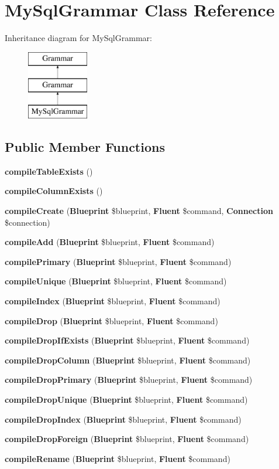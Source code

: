 \section{My\+Sql\+Grammar Class Reference}
\label{class_illuminate_1_1_database_1_1_schema_1_1_grammars_1_1_my_sql_grammar}
Inheritance diagram for My\+Sql\+Grammar\+:\begin{figure}[H]
\begin{center}
\leavevmode
\includegraphics[height=3.000000cm]{class_illuminate_1_1_database_1_1_schema_1_1_grammars_1_1_my_sql_grammar}
\end{center}
\end{figure}
\subsection*{Public Member Functions}
\begin{DoxyCompactItemize}
\item 
{\bf compile\+Table\+Exists} ()
\item 
{\bf compile\+Column\+Exists} ()
\item 
{\bf compile\+Create} ({\bf Blueprint} \$blueprint, {\bf Fluent} \$command, {\bf Connection} \$connection)
\item 
{\bf compile\+Add} ({\bf Blueprint} \$blueprint, {\bf Fluent} \$command)
\item 
{\bf compile\+Primary} ({\bf Blueprint} \$blueprint, {\bf Fluent} \$command)
\item 
{\bf compile\+Unique} ({\bf Blueprint} \$blueprint, {\bf Fluent} \$command)
\item 
{\bf compile\+Index} ({\bf Blueprint} \$blueprint, {\bf Fluent} \$command)
\item 
{\bf compile\+Drop} ({\bf Blueprint} \$blueprint, {\bf Fluent} \$command)
\item 
{\bf compile\+Drop\+If\+Exists} ({\bf Blueprint} \$blueprint, {\bf Fluent} \$command)
\item 
{\bf compile\+Drop\+Column} ({\bf Blueprint} \$blueprint, {\bf Fluent} \$command)
\item 
{\bf compile\+Drop\+Primary} ({\bf Blueprint} \$blueprint, {\bf Fluent} \$command)
\item 
{\bf compile\+Drop\+Unique} ({\bf Blueprint} \$blueprint, {\bf Fluent} \$command)
\item 
{\bf compile\+Drop\+Index} ({\bf Blueprint} \$blueprint, {\bf Fluent} \$command)
\item 
{\bf compile\+Drop\+Foreign} ({\bf Blueprint} \$blueprint, {\bf Fluent} \$command)
\item 
{\bf compile\+Rename} ({\bf Blueprint} \$blueprint, {\bf Fluent} \$command)
\end{DoxyCompactItemize}
